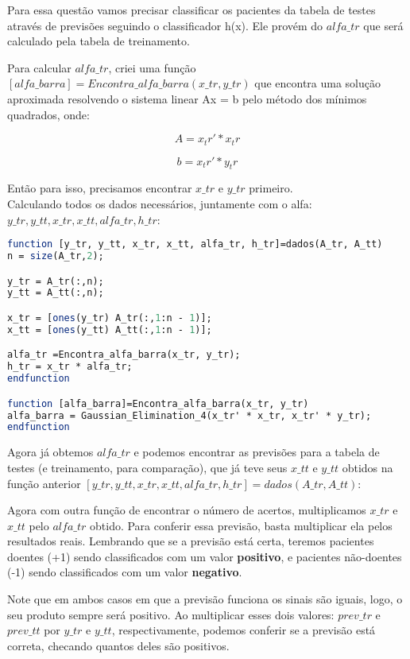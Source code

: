 \documentclass[leqno]{article}
\numberwithin{equation}{section}
\begin{document}
\begin{enumerate}
Para essa questão vamos precisar classificar os pacientes da tabela de testes através de previsões seguindo o classificador h(x). Ele provém do $alfa\_tr$ que será calculado pela tabela de treinamento.

Para calcular $alfa\_tr$, criei uma função $[alfa\_barra]=Encontra\_alfa\_barra(x\_tr, y\_tr)$ que encontra uma solução aproximada resolvendo o sistema linear Ax = b pelo método dos mínimos quadrados, onde:

$$A = x_tr' * x_tr$$

$$b = x_tr' * y_tr$$

Então para isso, precisamos encontrar $x\_tr$ e $y\_tr$ primeiro.\\
Calculando todos os dados necessários, juntamente com o alfa: $y\_tr, y\_tt, x\_tr, x\_tt, alfa\_tr, h\_tr$:\\

\begin{sol}
	\begin{lstlisting}[style=mystyle, language=Scilab]
function [y_tr, y_tt, x_tr, x_tt, alfa_tr, h_tr]=dados(A_tr, A_tt)
n = size(A_tr,2);

y_tr = A_tr(:,n);
y_tt = A_tt(:,n);

x_tr = [ones(y_tr) A_tr(:,1:n - 1)];
x_tt = [ones(y_tt) A_tt(:,1:n - 1)];

alfa_tr =Encontra_alfa_barra(x_tr, y_tr);
h_tr = x_tr * alfa_tr;
endfunction

function [alfa_barra]=Encontra_alfa_barra(x_tr, y_tr)
alfa_barra = Gaussian_Elimination_4(x_tr' * x_tr, x_tr' * y_tr);
endfunction
\end{lstlisting}	

Agora já obtemos $alfa\_tr$ e podemos encontrar as previsões para a tabela de testes (e treinamento, para comparação), que já teve seus $x\_tt$ e $y\_tt$ obtidos na função anterior $[y\_tr, y\_tt, x\_tr, x\_tt, alfa\_tr, h\_tr]=dados(A\_tr, A\_tt)$:

Agora com outra função de encontrar o número de acertos, multiplicamos $x\_tr$ e $x\_tt$ pelo $alfa\_tr$ obtido.
Para conferir essa previsão, basta multiplicar ela pelos resultados reais. Lembrando que se a previsão está certa, teremos
pacientes doentes (+1) sendo classificados com um valor \textbf{positivo}, e pacientes não-doentes (-1) sendo classificados com um valor \textbf{negativo}. 

Note que em ambos casos em que a previsão funciona os sinais são iguais, logo, o seu produto sempre será positivo. Ao multiplicar esses dois valores: $prev\_tr$ e $prev\_tt$ por $y\_tr$ e $y\_tt$, respectivamente, podemos conferir se a previsão está correta, checando quantos deles são positivos.


\end{sol}
\end{enumerate}
\end{document}
